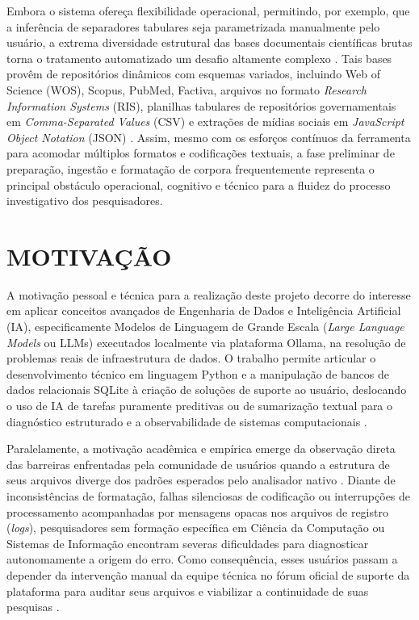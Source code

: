 \documentclass[
	oneside,
	a4paper,
	12pt,
	chapter=TITLE,
	section=TITLE,
	english,
	brazilian
]{abntex2}
\begin{document}
Embora o sistema ofereça flexibilidade operacional, permitindo, por exemplo, que a inferência de separadores tabulares seja parametrizada manualmente pelo usuário, a extrema diversidade estrutural das bases documentais científicas brutas torna o tratamento automatizado um desafio altamente complexo \cite{CorText2026}. Tais bases provêm de repositórios dinâmicos com esquemas variados, incluindo Web of Science (WOS), Scopus, PubMed, Factiva, arquivos no formato \textit{Research Information Systems} (RIS), planilhas tabulares de repositórios governamentais em \textit{Comma-Separated Values} (CSV) e extrações de mídias sociais em \textit{JavaScript Object Notation} (JSON) \cite{CorText2026}. Assim, mesmo com os esforços contínuos da ferramenta para acomodar múltiplos formatos e codificações textuais, a fase preliminar de preparação, ingestão e formatação de corpora frequentemente representa o principal obstáculo operacional, cognitivo e técnico para a fluidez do processo investigativo dos pesquisadores.

\FloatBarrier
\section{MOTIVAÇÃO}\label{sec:motivacao}


A motivação pessoal e técnica para a realização deste projeto decorre do interesse em aplicar conceitos avançados de Engenharia de Dados e Inteligência Artificial (IA), especificamente Modelos de Linguagem de Grande Escala (\textit{Large Language Models} ou LLMs) executados localmente via plataforma Ollama, na resolução de problemas reais de infraestrutura de dados. O trabalho permite articular o desenvolvimento técnico em linguagem Python e a manipulação de bancos de dados relacionais SQLite à criação de soluções de suporte ao usuário, deslocando o uso de IA de tarefas puramente preditivas ou de sumarização textual para o diagnóstico estruturado e a observabilidade de sistemas computacionais \cite{Majors2022,Lewis2020}.

Paralelamente, a motivação acadêmica e empírica emerge da observação direta das barreiras enfrentadas pela comunidade de usuários quando a estrutura de seus arquivos diverge dos padrões esperados pelo analisador nativo \cite{CorText2026}. Diante de inconsistências de formatação, falhas silenciosas de codificação ou interrupções de processamento acompanhadas por mensagens opacas nos arquivos de registro (\textit{logs}), pesquisadores sem formação específica em Ciência da Computação ou Sistemas de Informação encontram severas dificuldades para diagnosticar autonomamente a origem do erro. Como consequência, esses usuários passam a depender da intervenção manual da equipe técnica no fórum oficial de suporte da plataforma para auditar seus arquivos e viabilizar a continuidade de suas pesquisas \cite{CorText2026}.
\end{document}
